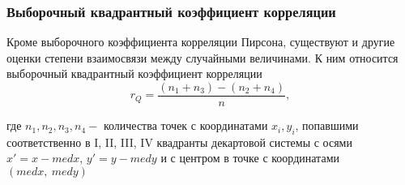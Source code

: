\documentclass[a4paper]{article}
\begin{document}
            \subsubsection{Выборочный квадрантный коэффициент корреляции}
                \noindent Кроме выборочного коэффициента корреляции Пирсона, существуют и другие оценки степени взаимосвязи между случайными величинами. К ним относится выборочный квадрантный коэффициент корреляции
                \begin{equation}
                    r_{Q} = \frac{(n_{1} + n_{3}) - (n_{2} + n_{4})}{n},
                    \label{rQ}
                \end{equation}

                \noindent где $n_1, n_2, n_3, n_4 - $ количества точек с координатами $x_i, y_i$, попавшими соответственно в I, II, III, IV квадранты декартовой системы с осями $x'=x-med x$, $y'=y-med y$ и с центром в точке с координатами $(med x,~med y)$
\end{document}
